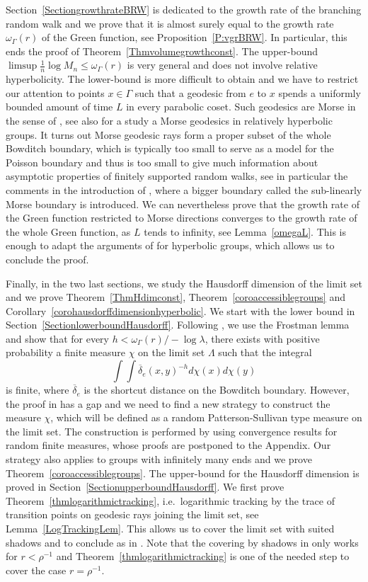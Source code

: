\documentclass{amsart}
\theoremstyle{definition}
\theoremstyle{remark}
\begin{document}
Section~\ref{SectiongrowthrateBRW} is dedicated to the growth rate of the branching random walk and we prove that it is almost surely equal to the growth rate $\omega_\Gamma(r)$ of the Green function, see Proposition~\ref{P:vgrBRW}.
In particular, this ends the proof of Theorem~\ref{Thmvolumegrowthconst}.
The upper-bound $\limsup \frac{1}{n}\log M_n\leq \omega_\Gamma(r)$ is very general and does not involve relative hyperbolicity.
The lower-bound is more difficult to obtain and we have to restrict our attention to points $x\in \Gamma$ such that a geodesic from $e$ to $x$ spends a uniformly bounded amount of time $L$ in every parabolic coset.
Such geodesics are Morse in the sense of \cite{Cordes}, see also \cite{Tran} for a study a Morse geodesics in relatively hyperbolic groups.
It turns out Morse geodesic rays form a proper subset of the whole Bowditch boundary, which is typically too small to serve as a model for the Poisson boundary and thus is too small to give much information about asymptotic properties of finitely supported random walks, see in particular the comments in the introduction of \cite{QRT}, where a bigger boundary called the sub-linearly Morse boundary is introduced.
We can nevertheless prove that the growth rate of the Green function restricted to Morse directions converges to the growth rate of the whole Green function, as $L$ tends to infinity, see Lemma~\ref{omegaL}.
This is enough to adapt the arguments of \cite{SWX} for hyperbolic groups, which allows us to conclude the proof.

Finally, in the two last sections, we study the Hausdorff dimension of the limit set and we prove Theorem~\ref{ThmHdimconst}, Theorem~\ref{coroaccessiblegroups} and Corollary~\ref{corohausdorffdimensionhyperbolic}.
We start with the lower bound in Section~\ref{SectionlowerboundHausdorff}.
Following \cite{SWX}, we use the Frostman lemma and show that for every $h<\omega_\Gamma(r)/-\log \lambda$, there exists with positive probability a finite measure $\chi$ on the limit set $\Lambda$ such that the integral
$$\int \int \overline{\delta}_e(x,y)^{-h} d\chi(x)d\chi(y)$$ is finite, where $\overline{\delta}_e$ is the shortcut distance on the Bowditch boundary.
However, the proof in \cite{SWX} has a gap and we need to find a new strategy to construct the measure $\chi$, which will be defined as a random Patterson-Sullivan type measure on the limit set.
The construction is performed by using convergence results for random finite measures, whose proofs are postponed to the Appendix.
Our strategy also applies to groups with infinitely many ends and we prove Theorem~\ref{coroaccessiblegroups}.
The upper-bound for the Hausdorff dimension is proved in Section~\ref{SectionupperboundHausdorff}.
We first prove Theorem~\ref{thmlogarithmictracking}, i.e.\ logarithmic tracking by the trace of transition points on geodesic rays joining the limit set, see Lemma~\ref{LogTrackingLem}.
This allows us to cover the limit set with suited shadows and to conclude as in \cite{SWX}.
Note that the covering by shadows in \cite{SWX} only works for $r<\rho^{-1}$ and Theorem~\ref{thmlogarithmictracking} is one of the needed step to cover the case $r=\rho^{-1}$.
\end{document}
